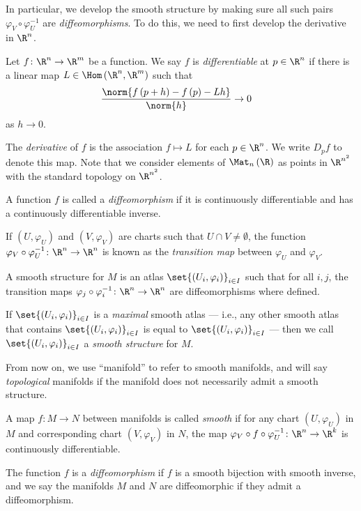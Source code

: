 \documentclass[10pt]{mypackage}
\begin{document}
In particular, we develop the smooth structure by making sure all such pairs $\varphi_{V}\circ\varphi_U^{-1}$ are \textit{diffeomorphisms}. To do this, we need to first develop the derivative in $\R^n$.
\begin{definition}
  Let $f\colon \R^n\rightarrow \R^m$ be a function. We say $f$ is \textit{differentiable} at $p\in \R^n$ if there is a linear map $L\in \Hom\left( \R^n,\R^m \right)$ such that
  \begin{align*}
    \frac{\norm{f\left( p+h \right)-f\left( p \right)-Lh}}{\norm{h}} &\rightarrow 0
  \end{align*}
  as $h\rightarrow 0$.\newline

  The \textit{derivative} of $f$ is the association $f\mapsto L$ for each $p\in \R^n$. We write $D_pf$ to denote this map. Note that we consider elements of $\Mat_{n}\left( \R \right)$ as points in $\R^{n^2}$ with the standard topology on $\R^{n^2}$.\newline

  A function $f$ is called a \textit{diffeomorphism} if it is continuously differentiable and has a continuously differentiable inverse.
\end{definition}
\begin{definition}
  If $\left( U,\varphi_U \right)$ and $\left( V,\varphi_V \right)$ are charts such that $U\cap V \neq \emptyset$, the function $\varphi_{V}\circ \varphi_{U}^{-1}\colon \R^n\rightarrow \R^n$ is known as the \textit{transition map} between $\varphi_U$ and $\varphi_V$.\newline

  A smooth structure for $M$ is an atlas $\set{\left( U_i,\varphi_i \right)}_{i\in I}$ such that for all $i,j$, the transition maps $\varphi_j\circ \varphi_i^{-1}\colon \R^n\rightarrow \R^n$ are diffeomorphisms where defined.\newline

  If $\set{\left( U_i,\varphi_i \right)}_{i\in I}$ is a \textit{maximal} smooth atlas --- i.e., any other smooth atlas that contains $\set{\left( U_i,\varphi_i \right)}_{i\in I}$ is equal to $\set{\left( U_i,\varphi_i \right)}_{i\in I}$ --- then we call $\set{\left( U_i,\varphi_i \right)}_{i\in I}$ a \textit{smooth structure} for $M$.
\end{definition}
\begin{note}
  From now on, we use ``manifold'' to refer to smooth manifolds, and will say \textit{topological} manifolds if the manifold does not necessarily admit a smooth structure.
\end{note}
\begin{definition}
  A map $f\colon M\rightarrow N$ between manifolds is called \textit{smooth} if for any chart $\left( U,\varphi_U \right)$ in $M$ and corresponding chart $\left( V,\varphi_V \right)$ in $N$, the map $\varphi_V\circ f \circ \varphi_U^{-1}\colon \R^n\rightarrow \R^k$ is continuously differentiable.\newline

  The function $f$ is a \textit{diffeomorphism} if $f$ is a smooth bijection with smooth inverse, and we say the manifolds $M$ and $N$ are diffeomorphic if they admit a diffeomorphism.
\end{definition}
\end{document}
